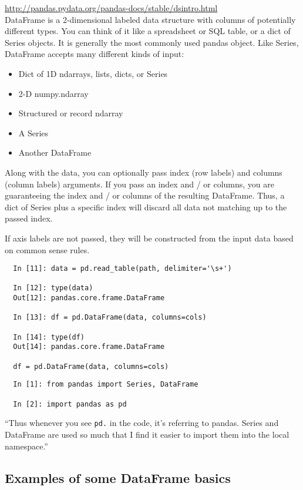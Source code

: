 \documentclass[11pt,a4paper]{article}
\begin{document}
\href{http://pandas.pydata.org/pandas-docs/stable/dsintro.html}{http://pandas.pydata.org/pandas-docs/stable/dsintro.html}\\

DataFrame is a 2-dimensional labeled data structure with columns of
potentially different types. You can think of it like a spreadsheet or
SQL table, or a dict of Series objects. It is generally the most
commonly used pandas object. Like Series, DataFrame accepts many
different kinds of input:
\begin{itemize}
\item{Dict of 1D ndarrays, lists, dicts, or Series}
\item{        2-D numpy.ndarray}
\item{Structured or record ndarray}
\item{A Series}
\item{Another DataFrame}
\end{itemize}

Along with the data, you can optionally pass index (row labels) and
columns (column labels) arguments. If you pass an index and / or
columns, you are guaranteeing the index and / or columns of the
resulting DataFrame. Thus, a dict of Series plus a specific index will
discard all data not matching up to the passed index.

If axis labels are not passed, they will be constructed from the input
data based on common sense rules.
\begin{lstlisting}
  In [11]: data = pd.read_table(path, delimiter='\s+')
  
  In [12]: type(data)
  Out[12]: pandas.core.frame.DataFrame
  
  In [13]: df = pd.DataFrame(data, columns=cols)
  
  In [14]: type(df)
  Out[14]: pandas.core.frame.DataFrame
  
  df = pd.DataFrame(data, columns=cols)
\end{lstlisting}

\begin{lstlisting}
  In [1]: from pandas import Series, DataFrame
  
  In [2]: import pandas as pd
\end{lstlisting}
``Thus whenever you see {\tt pd.} in the code, it's referring to
pandas. Series and DataFrame are used so much that I find it easier to
import them into the local namespace.''


\newpage
\subsection{Examples of some DataFrame basics}
\end{document}
